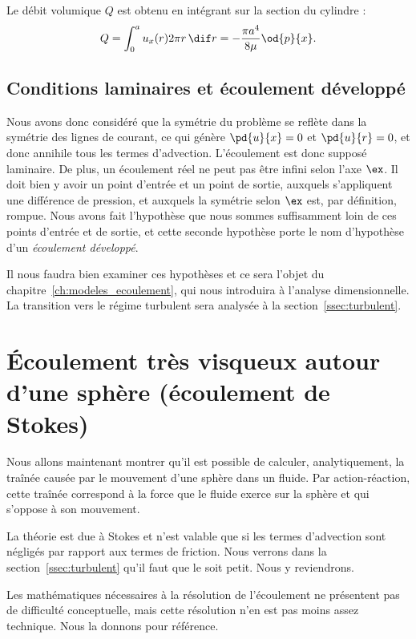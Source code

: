 Le débit volumique $Q$ est obtenu en intégrant sur la section du cylindre :
\begin{displaymath}
  Q = \int_0^a u_x(r) 2\pi r \, \dif r = -\frac{\pi a^4}{8\mu} \od{p}{x}.
\end{displaymath}

\subsection{Conditions laminaires et écoulement développé}

Nous avons donc considéré que la symétrie du problème se reflète dans la symétrie des lignes de courant, ce qui génère $\pd{u}{x} = 0$ et $\pd{u}{r} = 0$, et donc annihile tous les termes d'advection. L'écoulement est donc supposé laminaire. De plus, un écoulement réel ne peut pas être infini selon l'axe $\ex$. Il doit bien y avoir un point d'entrée et un point de sortie, auxquels s'appliquent une différence de pression, et auxquels la symétrie selon $\ex$ est, par définition, rompue. Nous avons fait l'hypothèse que nous sommes suffisamment loin de ces points d'entrée et de sortie, et cette seconde hypothèse porte le nom d'hypothèse d'un \emph{écoulement développé}.

Il nous faudra bien examiner ces hypothèses et ce sera l'objet du chapitre~\ref{ch:modeles_ecoulement}, qui nous introduira à l'analyse dimensionnelle. La transition vers le régime turbulent sera analysée à la section~\ref{ssec:turbulent}.

\section{Écoulement très visqueux autour d'une sphère (écoulement de Stokes) \label{sect:stokes}}

Nous allons maintenant montrer qu'il est possible de calculer, analytiquement, la traînée causée par le mouvement d'une sphère dans un fluide. Par action-réaction, cette traînée correspond à la force que le fluide exerce sur la sphère et qui s'oppose à son mouvement.

La théorie est due à Stokes et n'est valable que si les termes d'advection sont négligés par rapport aux termes de friction. Nous verrons dans la section~\ref{ssec:turbulent} qu'il faut que le  soit petit. Nous y reviendrons.

Les mathématiques nécessaires à la résolution de l'écoulement ne présentent pas de difficulté conceptuelle, mais cette résolution n'en est pas moins assez technique. Nous la donnons pour référence. 

